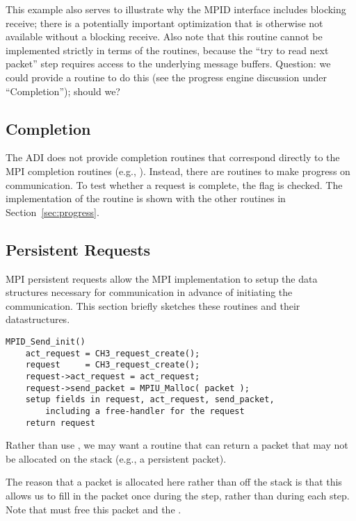 \documentclass{article}
\def\mpids#1#2{\code{#2}\index{#1!#2}}
\begin{document}
This example also serves to illustrate why the MPID interface includes
blocking receive; there is a potentially important optimization that
is otherwise not available without a blocking receive.  Also note that
this routine cannot be implemented strictly 
in terms of the  routines, because the ``try to read next
packet'' step requires access to the underlying message buffers.  
Question: we could provide a routine to do this (see the progress engine
discussion under ``Completion''); should we?

\subsection{Completion}
The ADI does not provide completion routines that correspond directly
to the MPI completion routines (e.g., ).  Instead,
there are routines to make progress on communication.  To test whether
a request is complete, the \mpids{MPID_Request}{busy} flag is checked.
The implementation of the  routine is shown with the other
 routines in Section~\ref{sec:progress}.



\subsection{Persistent Requests}
MPI persistent requests allow the MPI implementation to setup the data
structures necessary for communication in advance of initiating the
communication.  This section briefly sketches these routines and their
datastructures. 

\begin{verbatim}
MPID_Send_init()
    act_request = CH3_request_create();
    request     = CH3_request_create();
    request->act_request = act_request;
    request->send_packet = MPIU_Malloc( packet );
    setup fields in request, act_request, send_packet, 
        including a free-handler for the request
    return request   
\end{verbatim}
Rather than use , we may want a  routine that can
return a packet that may not be allocated on the stack (e.g., a persistent
packet).  

The reason that a packet is allocated here rather than off the stack
is that this allows us to fill in the packet once during the
 step, rather than during each
 step.  Note that  must
free this packet and the .
\end{document}
